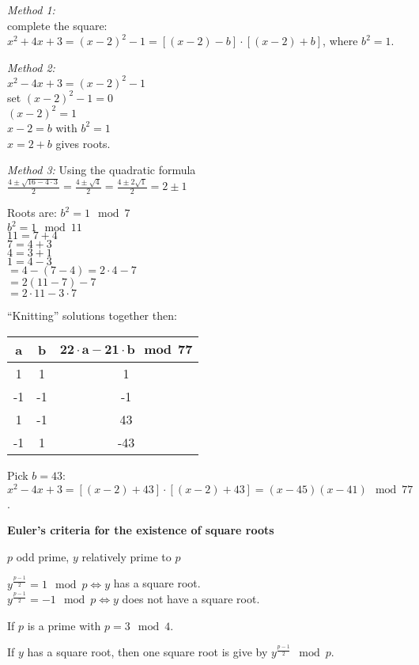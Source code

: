 \textit{Method 1:}\\
complete the square: $x^2 + 4x + 3 = (x-2)^2 - 1 = [(x-2)-b] \cdot [(x-2) + b]$, where $b^2 = 1$.

\textit{Method 2:}\\
$x^2 - 4x + 3 = (x-2)^2 - 1$ \\
set $(x-2)^2 - 1 = 0$ \\
$(x-2)^2 = 1$ \\
$x-2 = b$ with $b^2 = 1$\\
$x = 2 + b$ gives roots.

\textit{Method 3:} Using the quadratic formula\\
$\frac{4 \pm \sqrt{16 - 4 \cdot 3}}{2} = \frac{4 \pm \sqrt{4}}{2} = \frac{4 \pm 2\sqrt{1}}{2} = 2 \pm 1$

Roots are:
$b^2 = 1 \mod 7$ \\
$b^2 = 1 \mod 11$ \\
$11 = 7 + 4$\\
$7 = 4 + 3$\\
$4 = 3 + 1$\\
$1 = 4 - 3$\\
$ = 4 - (7-4) = 2 \cdot 4 - 7$\\
$ = 2(11-7)-7$\\
$ = 2 \cdot 11 - 3 \cdot 7$

``Knitting'' solutions together then:\\
\begin{tabular}{|c|c|c|} \hline
\textbf{a} & \textbf{b} & $\mathbf{22 \cdot a - 21 \cdot b \mod 77}$\\ \hline
1 & 1 & 1 \\ \hline
-1 & -1 & -1 \\ \hline
1 & -1 & 43 \\ \hline
-1 & 1 & -43 \\ \hline
\end{tabular}

Pick $b = 43$: $x^2 - 4x + 3 = [(x-2) + 43]\cdot[(x-2)+43] = (x-45)(x-41) \mod 77$.

\textbf{Euler's criteria for the existence of square roots}

$p$ odd prime, $y$ relatively prime to $p$

$y^{\frac{p-1}{2}} = 1 \mod p \iff y$ has a square root.\\
$y^{\frac{p-1}{2}} = -1 \mod p \iff y$ does not have a square root.

If $p$ is a prime with $p = 3 \mod 4$.

If $y$ has a square root, then one square root is give by $y^{\frac{p-1}{2}} \mod p$.

